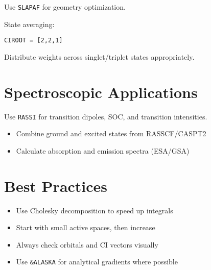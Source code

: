 Use \texttt{SLAPAF} for geometry optimization.

State averaging:

\begin{verbatim}
CIROOT = [2,2,1]
\end{verbatim}

Distribute weights across singlet/triplet states appropriately.

\section{Spectroscopic Applications}

Use \texttt{RASSI} for transition dipoles, SOC, and transition intensities.

\begin{itemize}
  \item Combine ground and excited states from RASSCF/CASPT2
  \item Calculate absorption and emission spectra (ESA/GSA)
\end{itemize}

\section{Best Practices}

\begin{itemize}
  \item Use Cholesky decomposition to speed up integrals
  \item Start with small active spaces, then increase
  \item Always check orbitals and CI vectors visually
  \item Use \texttt{\&ALASKA} for analytical gradients where possible
\end{itemize}
